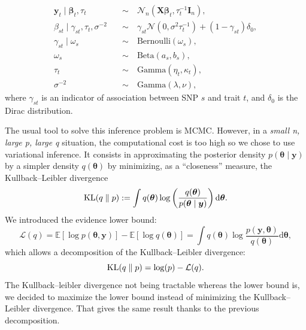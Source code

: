 \documentclass[a4paper, 11pt]{report}
\numberwithin{equation}{chapter}
\DeclareMathOperator*{\KL}{{\rm KL}}
\begin{document}
\begin{align*}
\boldsymbol{y}_t \mid \boldsymbol{\beta}_t,\tau_t \quad &\sim \quad \mathcal{N}_n\left(\boldsymbol{X}\boldsymbol{\beta}_t,\tau_t^{-1}\boldsymbol{I}_n\right),\\
\beta_{st} \mid \gamma_{st},\tau_t,\sigma^{-2} \quad &\sim \quad \gamma_{st}\mathcal{N}\left(0,\sigma^2\tau_t^{-1}\right)+(1-\gamma_{st})\delta_0,\\
\gamma_{st} \mid \omega_s \quad &\sim \quad \mathrm{Bernoulli}(\omega_s),\\
\omega_s \quad &\sim \quad \mathrm{Beta}(a_s,b_s),\\
\tau_t \quad &\sim \quad \mathrm{Gamma}(\eta_t,\kappa_t),\\
\sigma^{-2} \quad &\sim \quad \mathrm{Gamma}(\lambda, \nu),
\end{align*}
where $\gamma_{st}$ is an indicator of association between SNP $s$ and trait $t$, and $\delta_0$ is the Dirac distribution.

The usual tool to solve this inference problem is MCMC. However, in a \textit{small n, large p, large q} situation, the computational cost is too high so we chose to use variational inference. It consists in approximating the posterior density $p(\boldsymbol{\theta}\mid\boldsymbol{y})$ by a simpler density $q(\boldsymbol{\theta})$ by minimizing, as a ``closeness'' measure, the Kullback--Leibler divergence
$$
\KL(q\parallel p) := \int q(\boldsymbol{\theta})\log \left(\frac{q(\boldsymbol{\theta})}{p(\boldsymbol{\theta} \mid \boldsymbol{y})}\right) \mathrm{d}\boldsymbol{\theta}.
$$
We introduced the evidence lower bound:
$$
\mathcal{L}(q) = \mathbb{E}\left[\log p(\boldsymbol{\theta},\boldsymbol{y})\right] - \mathbb{E}\left[\log q(\boldsymbol{\theta})\right] =\int q(\boldsymbol{\theta})\log\frac{p(\boldsymbol{y},\boldsymbol{\theta})}{q(\boldsymbol{\theta})}\mathrm{d}\boldsymbol{\theta},
$$
which allows a decomposition of the Kullback--Leibler divergence:
$$
\KL(q\parallel p) = \log(p) - \mathcal{L}(q).
$$
The Kullback--leibler divergence not being tractable whereas the lower bound is, we decided to maximize the lower bound instead of minimizing the Kullback--Leibler divergence. That gives the same result thanks to the previous decomposition.
\end{document}
